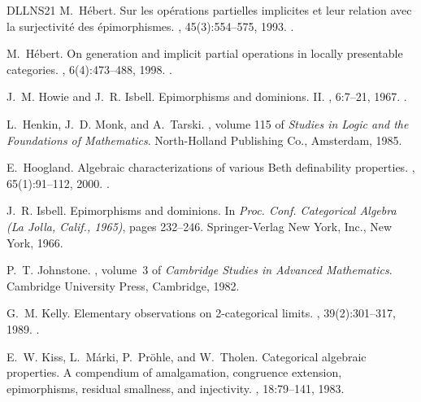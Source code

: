 \documentclass[a4paper,10pt,reqno]{amsart}
\theoremstyle{definition}
\theoremstyle{remark}
\begin{document}
\begin{thebibliography}{DLLNS21}
  M.~H{\'e}bert.
  \newblock Sur les op\'erations partielles implicites et leur relation avec la surjectivit\'e{} des \'epimorphismes.
  , 45(3):554--575, 1993.
  \newblock \href {https://doi.org/10.4153/CJM-1993-029-3} {}.
  
  M.~H{\'e}bert.
  \newblock On generation and implicit partial operations in locally presentable categories.
  , 6(4):473--488, 1998.
  \newblock \href {https://doi.org/10.1023/A:1008653513618} {}.
  
  J.~M. Howie and J.~R. Isbell.
  \newblock Epimorphisms and dominions. {II}.
  , 6:7--21, 1967.
  \newblock \href {https://doi.org/10.1016/0021-8693(67)90010-5} {}.
  
  L.~Henkin, J.~D. Monk, and A.~Tarski.
  , volume 115 of {\em Studies in Logic and the Foundations of Mathematics}.
  \newblock North-Holland Publishing Co., Amsterdam, 1985.
  
  E.~Hoogland.
  \newblock Algebraic characterizations of various {B}eth definability properties.
  , 65(1):91--112, 2000.
  \newblock \href {https://doi.org/10.1023/A:1005295109904} {}.
  
  J.~R. Isbell.
  \newblock Epimorphisms and dominions.
  \newblock In {\em Proc. {C}onf. {C}ategorical {A}lgebra ({L}a {J}olla, {C}alif., 1965)}, pages 232--246. Springer-Verlag New York, Inc., New York, 1966.
  
  P.~T. Johnstone.
  , volume~3 of {\em Cambridge Studies in Advanced Mathematics}.
  \newblock Cambridge University Press, Cambridge, 1982.
  
  G.~M. Kelly.
  \newblock Elementary observations on 2-categorical limits.
  , 39(2):301--317, 1989.
  \newblock \href {https://doi.org/10.1017/S0004972700002781} {}.
  
  E.~W. Kiss, L.~M{\'a}rki, P.~Pr{\"o}hle, and W.~Tholen.
  \newblock Categorical algebraic properties. {A} compendium of amalgamation, congruence extension, epimorphisms, residual smallness, and injectivity.
  , 18:79--141, 1983.
  

\end{thebibliography}
\end{document}
